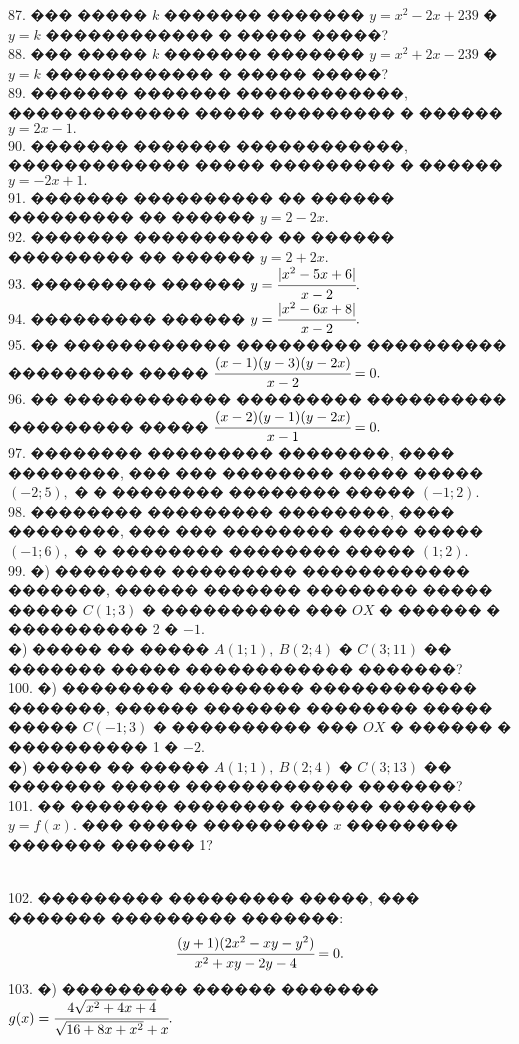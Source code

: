 \documentclass[12pt]{article}
\begin{document}
87. ��� ����� $k$ ������� ������� $y=x^2-2x+239$ � $y=k$ ������������ � ����� �����?\\
88. ��� ����� $k$ ������� ������� $y=x^2+2x-239$ � $y=k$ ������������ � ����� �����?\\
89. ������� ������� ������������, ������������� ����� ��������� � ������ $y=2x-1.$\\
90. ������� ������� ������������, ������������� ����� ��������� � ������ $y=-2x+1.$\\
91. ������� ���������� �� ������ ��������� �� ������ $y=2-2x.$\\
92. ������� ���������� �� ������ ��������� �� ������ $y=2+2x.$\\
93. ��������� ������ $y=\cfrac{|x^2-5x+6|}{x-2}.$\\
94. ��������� ������ $y=\cfrac{|x^2-6x+8|}{x-2}.$\\
95. �� ������������ ��������� ���������� ��������� ����� $\cfrac{(x-1)(y-3)(y-2x)}{x-2}=0.$\\
96. �� ������������ ��������� ���������� ��������� ����� $\cfrac{(x-2)(y-1)(y-2x)}{x-1}=0.$\\
97. �������� ��������� ��������, ���� ��������, ��� ��� �������� ����� ����� $(-2;5),$ � � �������� �������� ����� $(-1;2).$\\
98. �������� ��������� ��������, ���� ��������, ��� ��� �������� ����� ����� $(-1;6),$ � � �������� �������� ����� $(1;2).$\\
99. �) �������� ��������� ������������ �������, ������ ������� �������� ����� ����� $C(1;3)$ � ���������� ��� $OX$ � ������ � ���������� 2 � $-1.$\\
�) ����� �� ����� $A(1;1),\ B(2;4)$ � $C(3;11)$ �� ������� ����� ������������ �������?\\
100. �) �������� ��������� ������������ �������, ������ ������� �������� ����� ����� $C(-1;3)$ � ���������� ��� $OX$ � ������ � ���������� 1 � $-2.$\\
�) ����� �� ����� $A(1;1),\ B(2;4)$ � $C(3;13)$ �� ������� ����� ������������ �������?\\
101. �� ������� �������� ������ ������� $y=f(x).$ ��� ����� ��������� $x$ �������� ������� ������ 1?
\begin{figure}[ht!]
\end{figure}\\
102. ��������� ��������� �����, ��� ������� ��������� �������:
$$\cfrac{(y+1)(2x^2-xy-y^2)}{x^2+xy-2y-4}=0.$$
103. �) ��������� ������ ������� $g(x)=\cfrac{4\sqrt{x^2+4x+4}}{\sqrt{16+8x+x^2}+x}.$\\
\end{document}
